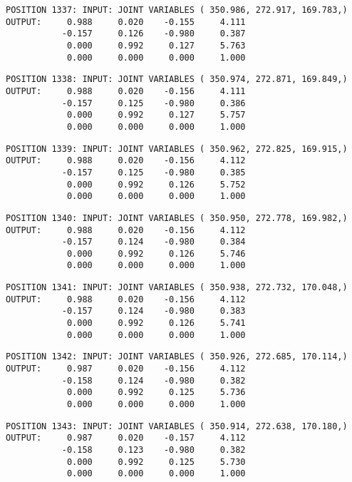 \begin{verbatim}
POSITION 1337: INPUT: JOINT VARIABLES ( 350.986, 272.917, 169.783,)
OUTPUT:     0.988     0.020    -0.155     4.111
           -0.157     0.126    -0.980     0.387
            0.000     0.992     0.127     5.763
            0.000     0.000     0.000     1.000
\end{verbatim} \pagebreak[1]\begin{verbatim}
POSITION 1338: INPUT: JOINT VARIABLES ( 350.974, 272.871, 169.849,)
OUTPUT:     0.988     0.020    -0.156     4.111
           -0.157     0.125    -0.980     0.386
            0.000     0.992     0.127     5.757
            0.000     0.000     0.000     1.000
\end{verbatim} \pagebreak[1]\begin{verbatim}
POSITION 1339: INPUT: JOINT VARIABLES ( 350.962, 272.825, 169.915,)
OUTPUT:     0.988     0.020    -0.156     4.112
           -0.157     0.125    -0.980     0.385
            0.000     0.992     0.126     5.752
            0.000     0.000     0.000     1.000
\end{verbatim} \pagebreak[1]\begin{verbatim}
POSITION 1340: INPUT: JOINT VARIABLES ( 350.950, 272.778, 169.982,)
OUTPUT:     0.988     0.020    -0.156     4.112
           -0.157     0.124    -0.980     0.384
            0.000     0.992     0.126     5.746
            0.000     0.000     0.000     1.000
\end{verbatim} \pagebreak[1]\begin{verbatim}
POSITION 1341: INPUT: JOINT VARIABLES ( 350.938, 272.732, 170.048,)
OUTPUT:     0.988     0.020    -0.156     4.112
           -0.157     0.124    -0.980     0.383
            0.000     0.992     0.126     5.741
            0.000     0.000     0.000     1.000
\end{verbatim} \pagebreak[1]\begin{verbatim}
POSITION 1342: INPUT: JOINT VARIABLES ( 350.926, 272.685, 170.114,)
OUTPUT:     0.987     0.020    -0.156     4.112
           -0.158     0.124    -0.980     0.382
            0.000     0.992     0.125     5.736
            0.000     0.000     0.000     1.000
\end{verbatim} \pagebreak[1]\begin{verbatim}
POSITION 1343: INPUT: JOINT VARIABLES ( 350.914, 272.638, 170.180,)
OUTPUT:     0.987     0.020    -0.157     4.112
           -0.158     0.123    -0.980     0.382
            0.000     0.992     0.125     5.730
            0.000     0.000     0.000     1.000
\end{verbatim} \pagebreak[1]\begin{verbatim}

\end{verbatim}
